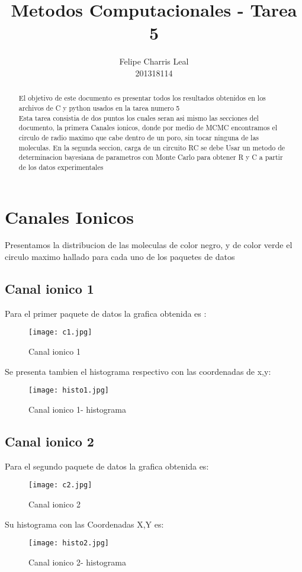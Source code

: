 \documentclass{article}
\begin{document}
\title{ Metodos Computacionales - Tarea 5}
\author{Felipe Charris Leal \\ 201318114}

\maketitle

\begin{abstract}

El objetivo de este documento es presentar todos los resultados obtenidos en los archivos de C y python usados en la tarea numero 5 \\ Esta tarea consistia de dos puntos los cuales seran asi mismo las secciones del documento, la primera Canales ionicos, donde por medio de MCMC encontramos el circulo de radio maximo que cabe dentro de un poro, sin tocar ninguna de las moleculas. En la segunda seccion, carga de un circuito RC  se debe Usar un metodo de determinacion bayesiana de parametros con Monte Carlo para obtener R y C a partir de los datos experimentales 
\end{abstract}

\section{Canales Ionicos}

Presentamos la distribucion de las moleculas de color negro, y de color verde el circulo maximo hallado para cada uno de los paquetes de datos


\subsection{Canal ionico 1}
Para el primer paquete de datos la grafica obtenida es :
\begin{figure}[H]
   \centering
    \texttt{[image: c1.jpg]}
    \caption{Canal ionico 1}
    \label{1}
    
\end{figure}

Se presenta tambien el histograma respectivo con las coordenadas de x,y:

\begin{figure}[H]
   \centering
    \texttt{[image: histo1.jpg]}
    \caption{Canal ionico 1- histograma}
    \label{2}
\end{figure}

\subsection{Canal ionico 2}
Para el segundo paquete de datos la grafica obtenida es:
\begin{figure}[H]
   \centering
    \texttt{[image: c2.jpg]}
    \caption{Canal ionico 2}
    \label{3}
\end{figure}
Su histograma con las Coordenadas X,Y es:
\begin{figure}[H]
   \centering
    \texttt{[image: histo2.jpg]}
    \caption{Canal ionico 2- histograma}
    \label{4}
\end{figure}
\end{document}

